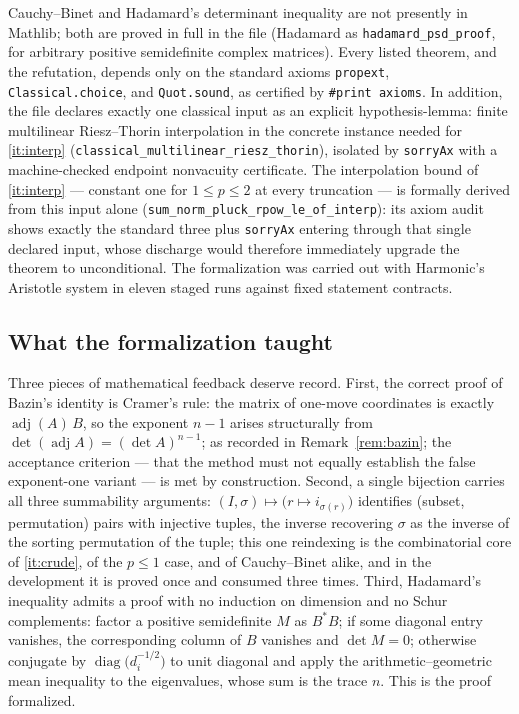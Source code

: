 \documentclass[11pt]{amsart}
\theoremstyle{definition}
\begin{document}
Cauchy--Binet and Hadamard's determinant inequality are not presently in Mathlib; both are proved in full in the file (Hadamard as \texttt{hadamard\_psd\_proof}, for arbitrary positive semidefinite complex matrices). Every listed theorem, and the refutation, depends only on the standard axioms \texttt{propext}, \texttt{Classical.choice}, and \texttt{Quot.sound}, as certified by \texttt{\#print axioms}. In addition, the file declares exactly one classical input as an explicit hypothesis-lemma: finite multilinear Riesz--Thorin interpolation in the concrete instance needed for \ref{it:interp} (\texttt{classical\_multilinear\_riesz\_thorin}), isolated by \texttt{sorryAx} with a machine-checked endpoint nonvacuity certificate. The interpolation bound of \ref{it:interp} --- constant one for $1\le p\le 2$ at every truncation --- is formally derived from this input alone (\texttt{sum\_norm\_pluck\_rpow\_le\_of\_interp}): its axiom audit shows exactly the standard three plus \texttt{sorryAx} entering through that single declared input, whose discharge would therefore immediately upgrade the theorem to unconditional. The formalization was carried out with Harmonic's Aristotle system in eleven staged runs against fixed statement contracts.

\subsection*{What the formalization taught}
Three pieces of mathematical feedback deserve record. First, the correct proof of Bazin's identity is Cramer's rule: the matrix of one-move coordinates is exactly $\operatorname{adj}(A)\,B$, so the exponent $n-1$ arises structurally from $\det(\operatorname{adj}A)=(\det A)^{n-1}$; as recorded in Remark~\ref{rem:bazin}; the acceptance criterion --- that the method must not equally establish the false exponent-one variant --- is met by construction. Second, a single bijection carries all three summability arguments: $(I,\sigma)\mapsto\big(r\mapsto i_{\sigma(r)}\big)$ identifies (subset, permutation) pairs with injective tuples, the inverse recovering $\sigma$ as the inverse of the sorting permutation of the tuple; this one reindexing is the combinatorial core of \ref{it:crude}, of the $p\le1$ case, and of Cauchy--Binet alike, and in the development it is proved once and consumed three times. Third, Hadamard's inequality admits a proof with no induction on dimension and no Schur complements: factor a positive semidefinite $M$ as $B^*B$; if some diagonal entry vanishes, the corresponding column of $B$ vanishes and $\det M=0$; otherwise conjugate by $\operatorname{diag}\big(d_i^{-1/2}\big)$ to unit diagonal and apply the arithmetic--geometric mean inequality to the eigenvalues, whose sum is the trace $n$. This is the proof formalized.
\end{document}
